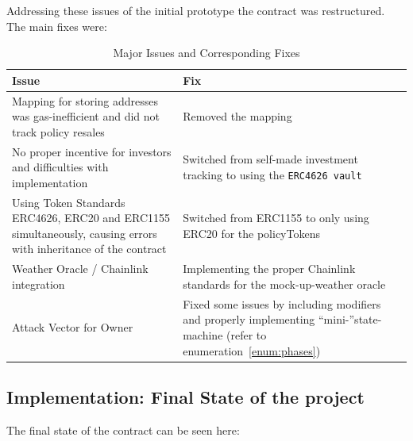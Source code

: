 \documentclass[11pt,a4paper]{article}
\begin{document}
	Addressing these issues of the initial prototype the contract was restructured.
    The main fixes were:

    \begin{table}[H]
        \centering
        \caption{Major Issues and Corresponding Fixes}
        \label{tab:issues-fixes}
        \begin{tabular}{|p{}|p{}|}
            \hline
            \textbf{Issue} & \textbf{Fix} \\
            \hline
            Mapping for storing addresses was gas-inefficient and did not track policy resales & Removed the mapping \\
            \hline
            No proper incentive for investors and difficulties with implementation & Switched from self-made investment tracking to using the \texttt{ERC4626 vault} \\
            \hline
            Using Token Standards ERC4626, ERC20 and ERC1155 simultaneously, causing errors with inheritance of the contract & Switched from ERC1155 to only using ERC20 for the policyTokens \\
            \hline
            Weather Oracle / Chainlink integration & Implementing the proper Chainlink standards for the mock-up-weather oracle~\parencite{AggregatorV3Interface} \\
            \hline
            Attack Vector for Owner & Fixed some issues by including modifiers and properly implementing \enquote{mini-}state-machine (refer to enumeration~\ref{enum:phases}) \\
            \hline
        \end{tabular}
    \end{table}


    \subsection{Implementation: Final State of the project}\label{subsec:final-state}

    The final state of the contract can be seen here:
\end{document}
